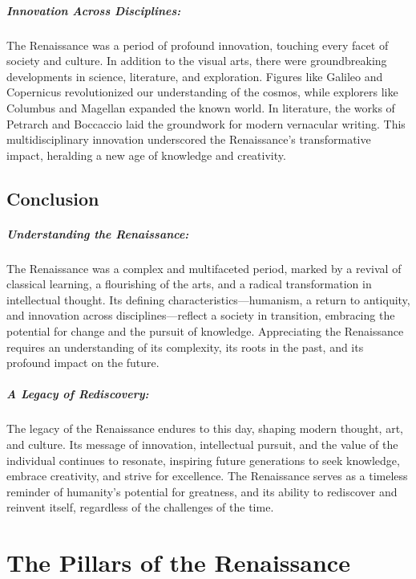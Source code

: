 \documentclass[a4paper,12pt]{book}
\begin{document}
\paragraph{Innovation Across Disciplines:}
The Renaissance was a period of profound innovation, touching every facet of society and culture. In addition to the visual arts, there were groundbreaking developments in science, literature, and exploration. Figures like Galileo and Copernicus revolutionized our understanding of the cosmos, while explorers like Columbus and Magellan expanded the known world. In literature, the works of Petrarch and Boccaccio laid the groundwork for modern vernacular writing. This multidisciplinary innovation underscored the Renaissance's transformative impact, heralding a new age of knowledge and creativity.

\section*{Conclusion}

\paragraph{Understanding the Renaissance:}
The Renaissance was a complex and multifaceted period, marked by a revival of classical learning, a flourishing of the arts, and a radical transformation in intellectual thought. Its defining characteristics—humanism, a return to antiquity, and innovation across disciplines—reflect a society in transition, embracing the potential for change and the pursuit of knowledge. Appreciating the Renaissance requires an understanding of its complexity, its roots in the past, and its profound impact on the future.

\paragraph{A Legacy of Rediscovery:}
The legacy of the Renaissance endures to this day, shaping modern thought, art, and culture. Its message of innovation, intellectual pursuit, and the value of the individual continues to resonate, inspiring future generations to seek knowledge, embrace creativity, and strive for excellence. The Renaissance serves as a timeless reminder of humanity’s potential for greatness, and its ability to rediscover and reinvent itself, regardless of the challenges of the time.

\chapter{The Pillars of the Renaissance}
\end{document}

